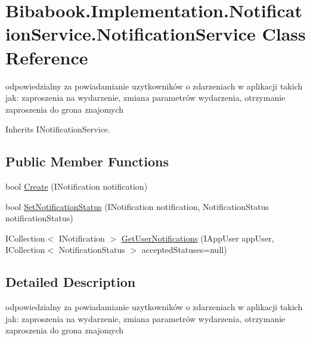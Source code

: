 \hypertarget{class_bibabook_1_1_implementation_1_1_notification_service_1_1_notification_service}{}\section{Bibabook.\+Implementation.\+Notification\+Service.\+Notification\+Service Class Reference}
\label{class_bibabook_1_1_implementation_1_1_notification_service_1_1_notification_service}


odpowiedzialny za powiadamianie uzytkowników o zdarzeniach w aplikacji takich jak\+: zaproszenia na wydarzenie, zmiana parametrów wydarzenia, otrzymanie zaproszenia do grona znajomych  




Inherits I\+Notification\+Service.

\subsection*{Public Member Functions}
\begin{DoxyCompactItemize}
\item 
bool \hyperlink{class_bibabook_1_1_implementation_1_1_notification_service_1_1_notification_service_aa7b8c602d5a131a45750533b9bcf2fe0}{Create} (I\+Notification notification)
\item 
bool \hyperlink{class_bibabook_1_1_implementation_1_1_notification_service_1_1_notification_service_afd21583a36aa8ef0c7c775300200d798}{Set\+Notification\+Status} (I\+Notification notification, Notification\+Status notification\+Status)
\item 
I\+Collection$<$ I\+Notification $>$ \hyperlink{class_bibabook_1_1_implementation_1_1_notification_service_1_1_notification_service_a90481a88843dca93fb03274cddb461ad}{Get\+User\+Notifications} (I\+App\+User app\+User, I\+Collection$<$ Notification\+Status $>$ accepted\+Statuses=null)
\end{DoxyCompactItemize}


\subsection{Detailed Description}
odpowiedzialny za powiadamianie uzytkowników o zdarzeniach w aplikacji takich jak\+: zaproszenia na wydarzenie, zmiana parametrów wydarzenia, otrzymanie zaproszenia do grona znajomych 



